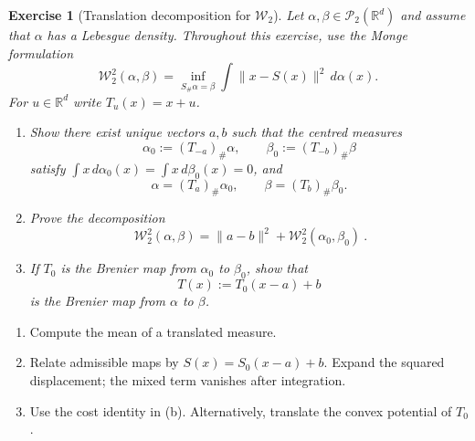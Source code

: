 \documentclass[11pt,a4paper]{article}
\theoremstyle{exostyle}
\newtheorem{exercise}{Exercise}
\newcommand{\push}{\#}
\newcommand{\Wtwo}{\mathcal{W}_2}
\begin{document}
\begin{exercise}[Translation decomposition for $\Wtwo$]\label{exo:translation}
Let $\alpha,\beta\in\mathcal P_2(\mathbb R^d)$ and assume that $\alpha$ has a Lebesgue density. Throughout this exercise, use the Monge formulation
\[
\Wtwo^2(\alpha,\beta)
=\inf_{S_{\push}\alpha=\beta}\int\|x-S(x)\|^2\,d\alpha(x).
\]
For $u\in\mathbb R^d$ write $T_u(x)=x+u$.

\begin{enumerate}[label=(\alph*), itemsep=4pt]
\item Show there exist unique vectors $a,b$
such that the \emph{centred} measures
\[
\alpha_0:=(T_{-a})_{\push}\alpha,\qquad \beta_0:=(T_{-b})_{\push}\beta
\]
satisfy $\int x\,d\alpha_0(x)=\int x\,d\beta_0(x)=0$, and
\[
\alpha=(T_a)_{\push}\alpha_0,\qquad \beta=(T_b)_{\push}\beta_0.
\]
\item Prove the decomposition
\[
\boxed{\ \Wtwo^2(\alpha,\beta)=\|a-b\|^2+\Wtwo^2(\alpha_0,\beta_0)\ }.
\]
\item If $T_0$ is the Brenier map from $\alpha_0$ to $\beta_0$, show that
\[
T(x):=T_0(x-a)+b
\]
is the Brenier map from $\alpha$ to $\beta$.
\end{enumerate}
\end{exercise}
\begin{hints}
\begin{enumerate}[label=(\alph*)]\item Compute the mean of a translated measure.\item Relate admissible maps by $S(x)=S_0(x-a)+b$. Expand the squared displacement; the mixed term vanishes after integration.\item Use the cost identity in (b). Alternatively, translate the convex potential of $T_0$.\end{enumerate}
\end{hints}
\end{document}

